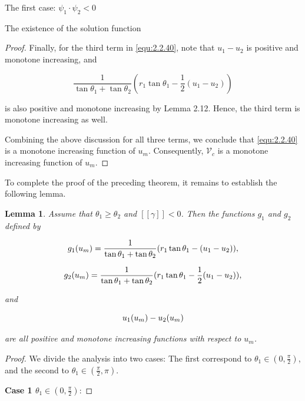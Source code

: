 \documentclass[letterpaper,reqno,10pt,twoside]{amsart}
\newtheorem{lemma}[theorem]{Lemma}
\theoremstyle{definition}
\theoremstyle{remark}
\begin{document}
\begin{section}{The first case: $\psi_1\cdot \psi_2<0$ }
\begin{subsection}{The existence of the solution function}
\begin{proof}
  Finally, for the third term in \eqref{equ:2.2.40}, note that $u_1-u_2$ is positive and monotone increasing, and

   \begin{equation*}
       \frac{1}{\tan\theta_1+\tan\theta_2}(r_1\tan\theta_1-\frac{1}{2}(u_1-u_2))
   \end{equation*}
   
   \noindent is also positive and monotone increasing by Lemma 2.12. Hence, the third term is monotone increasing as well.

    Combining the above discussion for all three terms, we conclude that \eqref{equ:2.2.40} is a monotone increasing function of $u_m$. Consequently, $\mathscr{V}_{c}$ is a monotone increasing function of $u_m$.
    \end{proof}

    To complete the proof of the preceding theorem, it remains to establish the following lemma.

   \begin{lemma}

    Assume that $\theta_1\geq\theta_2$ and $[\![\gamma]\!]<0$. Then the functions $g_1$ and $g_2$ defined by
    
   \begin{equation}{\label{equ:2.2.41}}
        g_1(u_m)=\frac{1}{\tan\theta_1+\tan\theta_2}(r_1\tan\theta_1-(u_1-u_2)),
    \end{equation}

    \begin{equation}{\label{equ:2.2.42}}
        g_2(u_m)=\frac{1}{\tan\theta_1+\tan\theta_2}(r_1\tan\theta_1-\frac{1}{2}(u_1-u_2)),
    \end{equation}

    \noindent and

    \begin{equation}{\label{equ:2.2.115}}
        u_1(u_{m})-u_2(u_{m})
    \end{equation}
    
    \noindent are all positive and monotone increasing functions with respect to $u_{m}$.

    
   \end{lemma}

  \begin{proof}

  We divide the analysis into two cases: The first correspond to $\theta_1\in(0,\frac{\pi}{2})$, and the second to $\theta_1\in(\frac{\pi}{2},\pi)$.
  
  \textbf{Case 1 $\theta_1\in (0,\frac{\pi}{2})$}: 
  

\end{proof}
\end{subsection}
\end{section}
\end{document}
